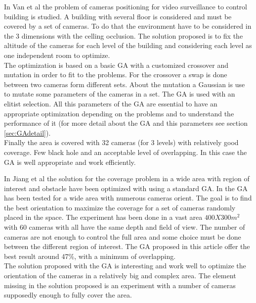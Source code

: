 In Van et al \cite{83*van2009} the problem of cameras positioning for video surveillance to control building is studied. A building with several floor is considered and must be covered by a set of cameras. To do that the environment have to be considered in the 3 dimensions with the celling occlusion. The solution proposed is to fix the altitude of the cameras for each level of the building and considering each level as one independent room to  optimize. \\
The optimization is based on a basic GA with a customized crossover and mutation in order to fit to the problems. 
For the crossover a swap is done between two cameras form different sets.%
About the mutation a Gaussian is use to mutate some parameters of the cameras in a set. The GA is used with an elitist selection. All this parameters of the GA are essential to have an appropriate optimization depending on the problems and to understand the performance of it (for more detail about the GA and this parameters see section \ref{sec:GAdetail}).  \\ 
Finally the area is covered with 32 cameras (for 3 levels) with relatively good coverage. Few black hole and an acceptable level of overlapping.  In this case the GA is well appropriate and work efficiently.

In Jiang et al \cite{165*jiang2010} the solution for the coverage problem in a wide area with region of interest and obstacle have been optimized with using a standard GA. In \cite{165*jiang2010} the GA has been tested for a wide area with numerous cameras orient. The goal is to find the best orientation to maximize the coverage for a set of cameras  randomly placed in the space. The experiment has been done in a vast area $400X300m^2$ with 60 cameras with all have the same depth and field of view. The number of cameras are not enough to control the full area and some choice must be done between the different region of interest. The GA proposed in this article offer the best result around 47\%, with a minimum of overlapping. \\
The solution proposed with the GA is interesting and work well to optimize the orientation of the cameras in  a relatively big and complex area. The element missing in the solution proposed is an experiment with a number of cameras supposedly enough to fully cover the area. \\

